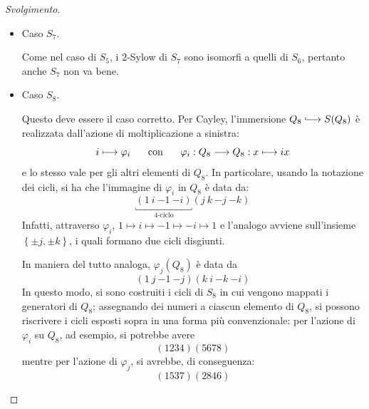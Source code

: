 \documentclass[12pt]{scrartcl}
\theoremstyle{style}
\newenvironment{svolgimento}{\renewcommand\qedsymbol{$\blacksquare$}\begin{proof}[Svolgimento]}{\end{proof}}
\numberwithin{equation}{subsection}
\newcommand{\longhookrightarrow}{\lhook\joinrel\longrightarrow}
\begin{document}
\begin{svolgimento}
\begin{itemize}
			Usando la proposizione \ref{qperm}, il fatto che $\sigma ^2 = \rho ^2 =\eta^2$ abbiano ordine $2$, cio\`e sono composte solo da trasposizioni, e che sono quadrati permette di concludere che si scrivono come il prodotto di trasposizioni; essendo in $S_6$, l'unica possibilit\`a \`e che
			\[
			\sigma ^2 = \rho ^2 = \eta^2 = (a\ b) ( c \ d)
			\] 
			perch\'e, in $S_6$, non esistono due coppie di trasposizioni tutte disgiunte.
			Ora si risolve $x^2 = (12)(34)$, che restituisce le seguenti possibilit\`a:
		\[
			\begin{array}{l l}
				x_1 = (1324)  &x_2 = (1423)\\
				x_3 = (1324)(56) & x_4 = (1423)(56)
			\end{array}
		\] 
		visto che la trasposizione $(56)$ scompare se elevata al quadrato.
		In questo modo, si vede che le soluzioni possibili sono $4$ in $S_6$, mentre in $Q_8$ se ne avevano $6$ di elementi di ordine $4$ con uguale quadrato.
	\item Caso $S_7$.

		Come nel caso di $S_5$, i $2$-Sylow di $S_7$ sono isomorfi a quelli di $S_6$, pertanto anche $S_7$ non va bene.
	\item Caso $S_8$.

		Questo deve essere il caso corretto.
		Per Cayley, l'immersione $Q_8 \longhookrightarrow S(Q_8)$ \`e realizzata dall'azione di moltiplicazione a sinistra:
		\[
		i\longmapsto \varphi _i \hspace{.5cm} \text{ con } \hspace{.5cm} \varphi _i : Q_8 \longrightarrow Q_8 : x \longmapsto ix
		\] 
		e lo stesso vale per gli altri elementi di $Q_8$.
		In particolare, usando la notazione dei cicli, si ha che l'immagine di $\varphi _i$ in $Q_8$ \`e data da:
		\[
		\underbracket{(1\ i \ {- 1}\ {- i} )}_{4\text{-ciclo}} (j\ k\ {-j}\ {-k})
		\] 
	Infatti, attraverso $\varphi _i$, $1\mapsto i \mapsto -1\mapsto -i\mapsto 1$ e l'analogo avviene sull'insieme $\left\{ \pm j, \pm k \right\} $, i quali formano due cicli disgiunti.

	In maniera del tutto analoga, $\varphi _j(Q_8)$ \`e data da
	\[
		(1\ j\ {-1}\ {-j})(k \ i \ {-k} \ {-i})
	\] 
	In questo modo, si sono costruiti i cicli di $S_8$ in cui vengono mappati i generatori di $Q_8$; assegnando dei numeri a ciascun elemento di $Q_8$, si possono riscrivere i cicli esposti sopra in una forma pi\`u convenzionale: per l'azione di $\varphi _i$ su $Q_8$, ad esempio, si potrebbe avere
	\[
		(1234)(5678)
	\] 
	mentre per l'azione di $\varphi _j$, si avrebbe, di conseguenza:
	\[
		(1537)(2846)
	\] 
	
	\end{itemize}
\end{svolgimento}
\end{document}
